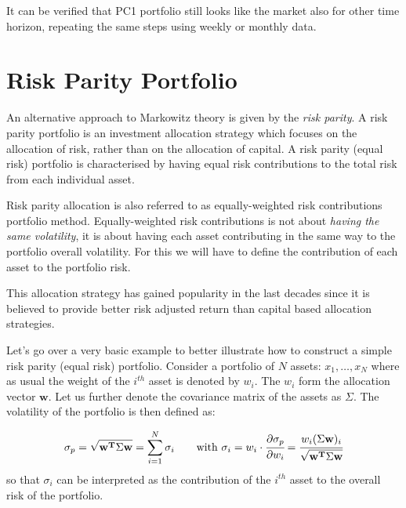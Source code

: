It can be verified that PC1 portfolio
still looks like the market also for other time horizon, repeating the
same steps using weekly or monthly data.

\section{Risk Parity Portfolio}
\label{risk-parity-portfolio}

An alternative approach to Markowitz theory is given by the
\emph{risk parity}. A risk parity portfolio is an investment allocation
strategy which focuses on the allocation of risk, rather than on the
allocation of capital. 
A risk parity (equal risk) portfolio is characterised by having equal risk contributions to the total risk from each individual asset. 

Risk parity allocation is also referred to as equally-weighted risk
contributions portfolio method. Equally-weighted risk contributions is
not about \emph{having the same volatility}, it is about having each
asset contributing in the same way to the portfolio overall volatility.
For this we will have to define the contribution of each asset to the
portfolio risk. 

This allocation strategy has gained popularity in the
last decades since it is believed to provide better risk adjusted return
than capital based allocation strategies.

Let's go over a very basic example to better illustrate how to construct
a simple risk parity (equal risk) portfolio. 
Consider a portfolio of \(N\) assets: \(x_{1}, \ldots, x_N\) where as
usual the weight of the $i^{th}$ asset is denoted by \(w_{i}\). The
\(w_{i}\) form the allocation vector \(\mathbf{w}\). Let us further
denote the covariance matrix of the assets as \(\Sigma\). The volatility
of the portfolio is then defined as:

\begin{equation} 
	\sigma_p={\sqrt {\mathbf{w^T}\Sigma \mathbf{w}}} = \sum_{i=1}^{N}\sigma _{i}\qquad\textrm{with}~\sigma _{i} = w_{i}\cdot \cfrac{\partial\sigma_p}{\partial w_{i}}={\cfrac {w_{i}(\Sigma \mathbf{w})_{i}}{\sqrt {\mathbf{w^T}\Sigma \mathbf{w}}}}
\end{equation}
so that \(\sigma _{i}\) can be interpreted as the contribution of the $i^{th}$ asset to the overall risk of the portfolio.

